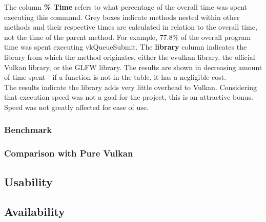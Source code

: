 \documentclass[12pt]{report}
\theoremstyle{definition}
\begin{document}

        The column \textbf{\% Time} refers to what percentage of the overall time was
        spent executing this command. Grey boxes indicate methods nested
        within other methods and their respective times are calculated in
        relation to the overall time, not the time of the parent method.
        For example, 77.8\% of the overall program time was spent executing
        vkQueueSubmit. The \textbf{library} column indicates the library from which
        the method originates, either the evulkan library, the official Vulkan
        library, or the GLFW library. The results are shown in decreasing
        amount of time spent - if a function is not in the table, it has a
        negligible cost. \\

        The results indicate the library adds very little overhead to Vulkan.
        Considering that execution speed was not a goal for the project,
        this is an attractive bonus. Speed was not greatly affected for
        ease of use.

      \subsubsection{Benchmark}

      \subsubsection{Comparison with Pure Vulkan}

    \subsection{Usability}

    \subsection{Availability}
\end{document}
